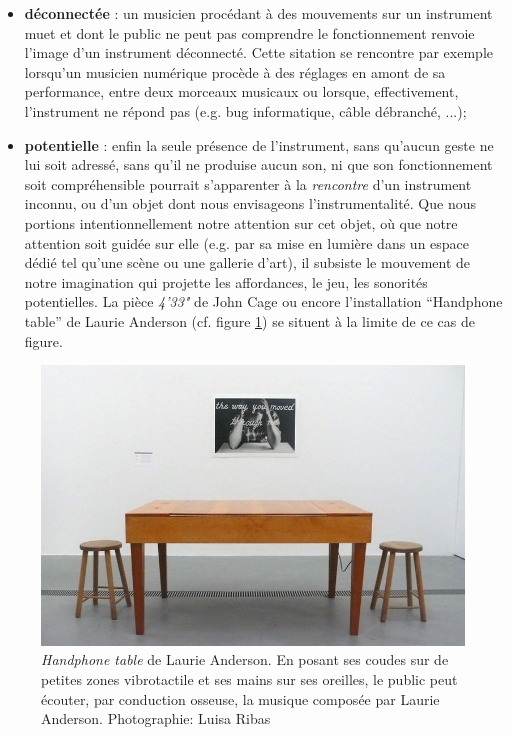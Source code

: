 \begin{itemize}[noitemsep]
	\item \textbf{déconnectée} : un musicien procédant à des mouvements sur un instrument muet et dont le public ne peut pas comprendre le fonctionnement renvoie l'image d'un instrument déconnecté. Cette sitation se rencontre par exemple lorsqu'un musicien numérique procède à des réglages en amont de sa performance, entre deux morceaux musicaux ou lorsque, effectivement, l'instrument ne répond pas (e.g. bug informatique, câble débranché, ...);
	\item \textbf{potentielle} : enfin la seule présence de l'instrument, sans qu'aucun geste ne lui soit adressé, sans qu'il ne produise aucun son, ni que son fonctionnement soit compréhensible pourrait s'apparenter à la \textit{rencontre} d'un instrument inconnu, ou d'un objet dont nous envisageons l'instrumentalité. Que nous portions intentionnellement notre attention sur cet objet, où que notre attention soit guidée sur elle (e.g. par sa mise en lumière dans un espace dédié tel qu'une scène ou une gallerie d'art), il subsiste le mouvement de notre imagination qui projette les affordances, le jeu, les sonorités potentielles. La pièce \textit{4'33"} de John Cage ou encore l'installation ``Handphone table'' de Laurie Anderson (cf. figure \ref{fig:gesture:HandphoneTable}) se situent à la limite de ce cas de figure.
\end{itemize}
\begin{figure}[!htbp]
	\captionsetup{format=plain}%
	\includegraphics[width=\linewidth]{gfx/03_gesture/LaurieAnderson-HandphoneTable-PhotoLuisaRibas.jpg}
	\caption[\textit{Handphone table} de Laurie Anderson]{\textit{Handphone table} de Laurie Anderson. En posant ses coudes sur de petites zones vibrotactile et ses mains sur ses oreilles, le public peut écouter, par conduction osseuse, la musique composée par Laurie Anderson. Photographie: Luisa Ribas}
	\label{fig:gesture:HandphoneTable}
\end{figure}
